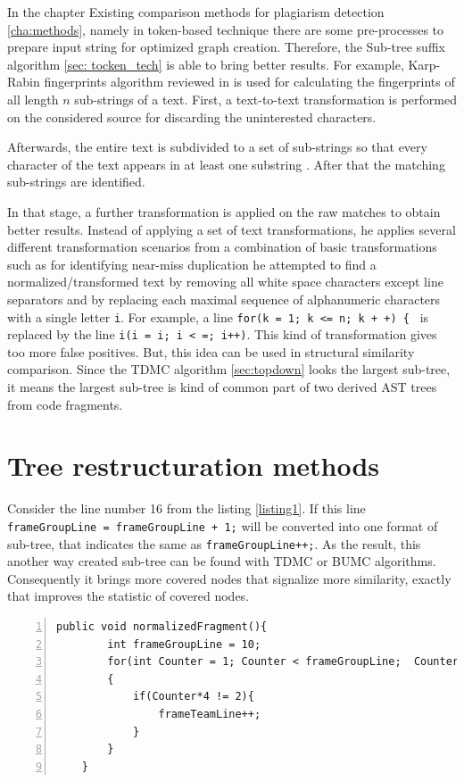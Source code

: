 \documentclass{report}
\begin{document}
In the chapter Existing comparison methods for plagiarism detection \ref{cha:methods}, namely in token-based technique there are some pre-processes to prepare input string for optimized graph creation. Therefore, the Sub-tree suffix algorithm \ref{sec: tocken_tech} is able to bring better results.
For example, Karp-Rabin fingerprints algorithm reviewed in \cite{software_clone_detection} is used for calculating the fingerprints of all
length $n$ sub-strings of a text. First, a text-to-text transformation is performed on the considered source for discarding the uninterested characters.

Afterwards, the entire text
is subdivided to a set of sub-strings so that every character of the text appears in at least
one substring \cite{software_clone_detection}. After that the matching sub-strings are identified. 

In that stage, a further transformation is applied on the raw matches to obtain better results. Instead of applying
a set of text transformations, he applies several different transformation scenarios
from a combination of basic transformations such as for identifying near-miss duplication he
attempted to find a normalized/transformed text by removing all white space characters
except line separators and by replacing each maximal sequence of alphanumeric characters
with a single letter \texttt{i}. For example, a line \texttt{for(k = 1; k <= n; k + +) \{ } is replaced by
the line \texttt{i(i = i; i < =; i++)}. This kind of transformation gives too more false positives. But, this idea can be used in structural similarity comparison. Since the TDMC algorithm \ref{sec:topdown} looks the largest sub-tree, it means the largest sub-tree is kind of common part of two derived AST trees from code fragments. \\

\section{Tree restructuration methods}
Consider the line number 16 from the listing \ref{listing1}. If this line \texttt{frameGroupLine = frameGroupLine + 1;} will be converted into one format of sub-tree, that indicates the same as \texttt{frameGroupLine++;}. As the result, this another way created sub-tree can be found with TDMC or BUMC algorithms. Consequently it brings more covered nodes that signalize more similarity, exactly that improves the statistic of covered nodes.

\begin{lstlisting}[caption= {Normalized function \texttt{normalizedFragment()} concerning variable \texttt {frameGroupLine}}, label = listing2, numbers=left, numbersep=-5pt]
	public void normalizedFragment(){
		int frameGroupLine = 10;
		for(int Counter = 1; Counter < frameGroupLine;  Counter =+ 2)
		{
			if(Counter*4 != 2){ 
				frameTeamLine++;
			}
		}
	}
\end{lstlisting}
\end{document}
